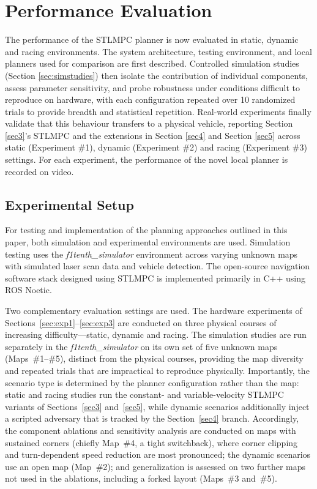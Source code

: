 \documentclass[journal]{IEEEtran}
\begin{document}
\section{Performance Evaluation}\label{sec6} %
The performance of the STLMPC planner is now evaluated in static, dynamic and racing environments. The system architecture, testing environment, and local planners used for comparison are first described. Controlled simulation studies (Section \ref{sec:simstudies}) then isolate the contribution of individual components, assess parameter sensitivity, and probe robustness under conditions difficult to reproduce on hardware, with each configuration repeated over 10 randomized trials to provide breadth and statistical repetition. Real-world experiments finally validate that this behaviour transfers to a physical vehicle, reporting Section \ref{sec3}'s STLMPC and the extensions in Section \ref{sec4} and Section \ref{sec5} across static (Experiment \#1), dynamic (Experiment \#2) and racing (Experiment \#3) settings. For each experiment, the performance of the novel local planner is recorded on video.

\subsection{Experimental Setup} %
For testing and implementation of the planning approaches outlined in this paper, both simulation and experimental environments are used. Simulation testing uses the \textit{f1tenth\_simulator} environment \cite{Babu2020} across varying unknown maps with simulated laser scan data and vehicle detection. The open-source navigation software stack designed using STLMPC is implemented primarily in C++ using ROS Noetic.

Two complementary evaluation settings are used. The hardware experiments of Sections~\ref{sec:exp1}--\ref{sec:exp3} are conducted on three physical courses of increasing difficulty---static, dynamic and racing. The simulation studies are run separately in the \textit{f1tenth\_simulator} on its own set of five unknown maps (Maps~\#1--\#5), distinct from the physical courses, providing the map diversity and repeated trials that are impractical to reproduce physically. Importantly, the scenario type is determined by the planner configuration rather than the map: static and racing studies run the constant- and variable-velocity STLMPC variants of Sections~\ref{sec3} and~\ref{sec5}, while dynamic scenarios additionally inject a scripted adversary that is tracked by the Section~\ref{sec4} branch. Accordingly, the component ablations and sensitivity analysis are conducted on maps with sustained corners (chiefly Map~\#4, a tight switchback), where corner clipping and turn-dependent speed reduction are most pronounced; the dynamic scenarios use an open map (Map~\#2); and generalization is assessed on two further maps not used in the ablations, including a forked layout (Maps~\#3 and~\#5).
\end{document}
